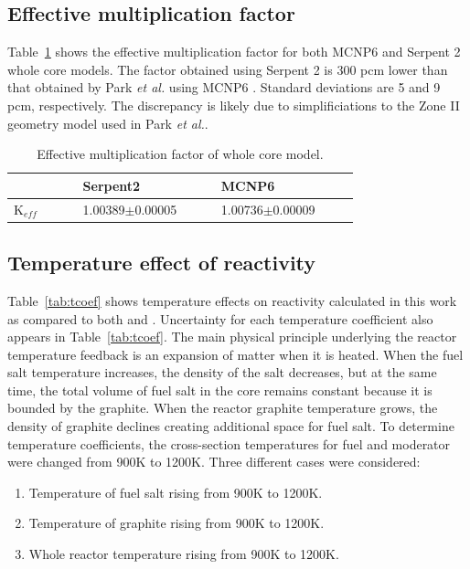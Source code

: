 \documentclass{anstrans}
\begin{document}
\subsection{Effective multiplication factor}
Table~\ref{tab:keff} shows the effective multiplication factor for both MCNP6 
and Serpent 2 whole core models. The factor obtained using Serpent 2 is 300 pcm 
lower than that obtained by Park \emph{et al.} using MCNP6 \cite{park_whole_2015}. Standard 
deviations are 5 and 9 pcm, respectively. The discrepancy is likely due to 
simplificiations to the Zone II geometry model used in Park \emph{et al.}.
\captionsetup[table]{
  labelsep = newline,
  name = TABLE, 
  justification=justified,
  singlelinecheck=false,%
  labelsep=colon,%
  skip = \medskipamount}
\begin{table}[h!]
\caption{Effective multiplication factor of whole core model.}
\begin{tabular}{p{0.15\linewidth} p{0.3\linewidth} p{0.3\linewidth}} \toprule
      & Serpent2      & MCNP6 \cite{park_whole_2015}          
\\ \midrule
K$_{eff}$  & 1.00389$\pm$0.00005 & 1.00736$\pm$0.00009
\\
\bottomrule
\end{tabular}
  \label{tab:keff}
\end{table}
\subsection{Temperature effect of reactivity}
Table~\ref{tab:tcoef} shows temperature effects on reactivity calculated in 
this work as compared to both \cite{park_whole_2015} and 
\cite{robertson_conceptual_1971}. Uncertainty for each temperature coefficient 
also appears in Table~\ref{tab:tcoef}. The main physical principle underlying 
the reactor temperature feedback is an expansion of matter when it is heated. 
When the fuel salt temperature increases, the density of the salt decreases, 
but at the same time, the total volume of fuel salt in the core remains 
constant because it is bounded by the graphite. When the reactor graphite 
temperature grows, the density of graphite declines creating additional space 
for fuel salt. To determine temperature coefficients, the cross-section temperatures for fuel and moderator were changed from 900K to 1200K. Three different cases were considered:
\begin{enumerate}  
\item Temperature of fuel salt rising from 900K to 1200K.
\item Temperature of graphite rising from 900K to 1200K. 
\item Whole reactor temperature rising from 900K to 1200K.
\end{enumerate}
\end{document}
